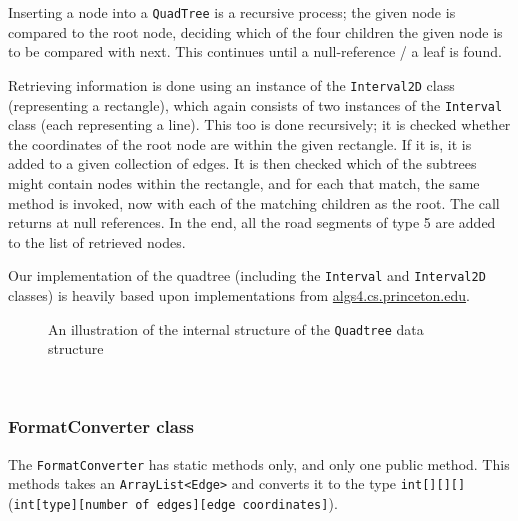 Inserting a node into a \texttt{QuadTree} is a recursive process; the given node is compared to the root node, deciding which of the four children the given node is to be compared with next. This continues until a null-reference / a leaf is found.

Retrieving information is done using an instance of the \texttt{Interval2D} class (representing a rectangle), which again consists of two instances of the \texttt{Interval} class (each representing a line). This too is done recursively; it is checked whether the coordinates of the root node are within the given rectangle. If it is, it is added to a given collection of edges. It is then checked which of the subtrees might contain nodes within the rectangle, and for each that match, the same method is invoked, now with each of the matching children as the root. The call returns at null references. In the end, all the road segments of type 5 are added to the list of retrieved nodes.

Our implementation of the quadtree (including the \texttt{Interval} and \texttt{Interval2D} classes) is heavily based upon implementations from \url{algs4.cs.princeton.edu}.
\\
\begin{figure}[!h]
\centering
{}
	\caption{An illustration of the internal structure of the \texttt{Quadtree} data structure}
\end{figure}
\\
\subsubsection{FormatConverter class} %
The \texttt{FormatConverter} has static methods only, and only one public method. This methods takes an \texttt{ArrayList<Edge>} and converts it to the type \texttt{int[][][]} \\(\texttt{int[type][number of edges][edge coordinates]}).

